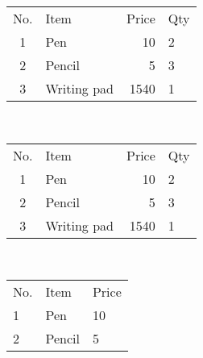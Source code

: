 \documentclass{article}
\begin{document}
	
	\begin{tabular}{clrl}
		No. & Item & Price & Qty\\
		1 & Pen & 10 & 2\\
		2 & Pencil & 5 & 3\\
		3 & Writing pad & 1540 & 1
	\end{tabular}\\
	\begin{tabular}{cp{4cm}rl}
		No. & Item & Price & Qty\\
		1 & Pen & 10 & 2\\
		2 & Pencil & 5 & 3\\
		3 & Writing pad & 1540 & 1
	\end{tabular}\\
	\begin{tabular}{p{1cm}p{3cm}p{2cm}}
		No. & Item & Price \\
		1 & Pen & 10 \\
		2 & Pencil & 5 \\
	\end{tabular}
	
\end{document}
